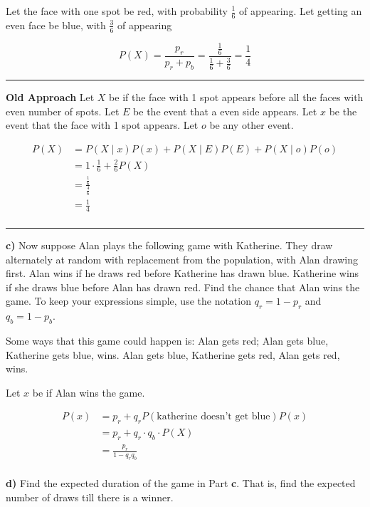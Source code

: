 \documentclass[11pt]{article}
\begin{document}
Let the face with one spot be red, with probability $ \frac{1}{6} $ of appearing. Let getting an even face be blue, with $ \frac{3}{6} $ of appearing

\[
P(X) = \frac{p_{r}}{p_{r}+p_{b}} = \frac{\frac{1}{6}}{\frac{1}{6} + \frac{3}{6}} = \frac{1}{4}
\]



\rule{\textwidth}{0.4pt}
\textbf{Old Approach}
Let $ X $ be if the face with 1 spot appears before all the faces with even number of spots. Let $ E$ be the event that a even side appears. Let $ x $ be the event that the face with 1 spot appears. Let $ o $ be any other event.

\begin{align*}
	P(X) &= P(X \mid x)P(x) + P(X \mid E)P(E) + P(X \mid o)P(o) \\
	&= 1\cdot \frac{1}{6} + \frac{2}{6}P(X) \\
	&= \frac{\frac{1}{6}}{\frac{4}{6}} \\
	&= \frac{1}{4} \\
\end{align*}

\rule{\textwidth}{0.4pt}
\vspace{5mm}

\textbf{c)} Now suppose Alan plays the following game with Katherine.
They draw alternately at random with replacement from the population,
with Alan drawing first. Alan wins if he draws red before Katherine has
drawn blue. Katherine wins if she draws blue before Alan has drawn red.
Find the chance that Alan wins the game. To keep your expressions
simple, use the notation \(q_r = 1-p_r\) and \(q_b = 1 - p_b\).


Some ways that this game could happen is: Alan gets red; Alan gets blue, Katherine gets blue, wins. Alan gets blue, Katherine gets red, Alan gets red, wins.  

Let $ x $ be if Alan wins the game. 



\begin{align*}
 P(x)	&= p_{r} + q_{r} P(\text{katherine doesn't get blue})P(x)  \\
 &= p_{r} + q_{r} \cdot q_{b} \cdot  P(X) \\
 &= \frac{p_{r}}{1-q_{r}q_{b}} \\
\end{align*}






\textbf{d)} Find the expected duration of the game in Part \textbf{c}.
That is, find the expected number of draws till there is a winner.
\end{document}
